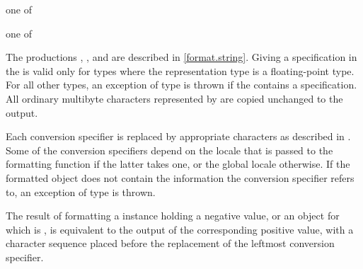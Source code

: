 \begin{ncbnf}
 \textnormal{one of}\br
\end{ncbnf}

\begin{ncbnf}
 \textnormal{one of}\br
    \br
\end{ncbnf}

The productions
,
, and
are described in \ref{format.string}.
Giving a  specification
in the 
is valid only for  types
where the representation type 
is a floating-point type.
For all other  types,
an exception of type  is thrown
if the 
contains a  specification.
All ordinary multibyte characters
represented by 
are copied unchanged to the output.

\pnum
Each conversion specifier 
is replaced by appropriate characters
as described in .
Some of the conversion specifiers
depend on the locale that is passed to the formatting function
if the latter takes one,
or the global locale otherwise.
If the formatted object does not contain the information
the conversion specifier refers to,
an exception of type  is thrown.

\pnum
The result of formatting
a  instance holding a negative value, or
an  object  for which  is ,
is equivalent to the output of the corresponding positive value,
with a  character sequence
placed before the replacement of the leftmost conversion specifier.
\begin{example}
\end{example}

